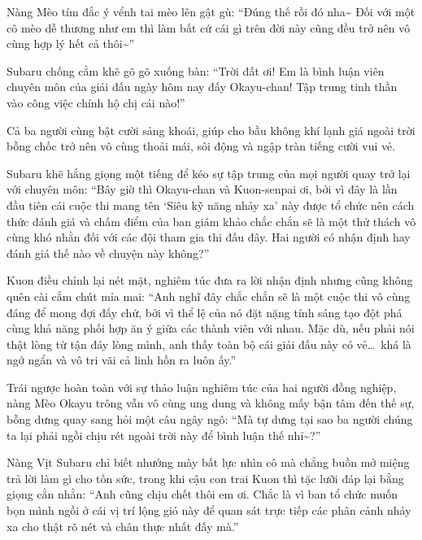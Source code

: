\documentclass[../main.tex]{subfiles}
\begin{document}
Nàng Mèo tím đắc ý vểnh tai mèo lên gật gù: ``Đúng thế rồi đó nha\~{} Đối với một cô mèo dễ thương như em thì làm bất cứ cái gì trên đời này cũng đều trở nên vô cùng hợp lý hết cả thôi\~{}''

Subaru chống cằm khẽ gõ gõ xuống bàn: ``Trời đất ơi! Em là bình luận viên chuyên môn của giải đấu ngày hôm nay đấy Okayu-chan! Tập trung tinh thần vào công việc chính hộ chị cái nào!''

Cả ba người cùng bật cười sảng khoái, giúp cho bầu không khí lạnh giá ngoài trời bỗng chốc trở nên vô cùng thoải mái, sôi động và ngập tràn tiếng cười vui vẻ.

Subaru khẽ hắng giọng một tiếng để kéo sự tập trung của mọi người quay trở lại với chuyên môn: ``Bây giờ thì Okayu-chan và Kuon-senpai ơi, bởi vì đây là lần đầu tiên cái cuộc thi mang tên `Siêu kỹ năng nhảy xa' này được tổ chức nên cách thức đánh giá và chấm điểm của ban giám khảo chắc chắn sẽ là một thử thách vô cùng khó nhằn đối với các đội tham gia thi đấu đây. Hai người có nhận định hay đánh giá thế nào về chuyện này không?''

Kuon điều chỉnh lại nét mặt, nghiêm túc đưa ra lời nhận định nhưng cũng không quên cài cắm chút mỉa mai: ``Anh nghĩ đây chắc chắn sẽ là một cuộc thi vô cùng đáng để mong đợi đấy chứ, bởi vì thể lệ của nó đặt nặng tính sáng tạo đột phá cùng khả năng phối hợp ăn ý giữa các thành viên với nhau. Mặc dù, nếu phải nói thật lòng từ tận đáy lòng mình, anh thấy toàn bộ cái giải đấu này có vẻ\dots\ khá là ngớ ngẩn và vô tri vãi cả linh hồn ra luôn ấy.''

Trái ngược hoàn toàn với sự thảo luận nghiêm túc của hai người đồng nghiệp, nàng Mèo Okayu trông vẫn vô cùng ung dung và không mấy bận tâm đến thế sự, bỗng dưng quay sang hỏi một câu ngây ngô: ``Mà tự dưng tại sao ba người chúng ta lại phải ngồi chịu rét ngoài trời này để bình luận thế nhỉ\~{}?''

Nàng Vịt Subaru chỉ biết nhướng mày bất lực nhìn cô mà chẳng buồn mở miệng trả lời làm gì cho tốn sức, trong khi cậu con trai Kuon thì tặc lưỡi đáp lại bằng giọng cằn nhằn: ``Anh cũng chịu chết thôi em ơi. Chắc là vì ban tổ chức muốn bọn mình ngồi ở cái vị trí lộng gió này để quan sát trực tiếp các phân cảnh nhảy xa cho thật rõ nét và chân thực nhất đấy mà.''

\subsubsection*{\label{ep-003.I}}
\end{document}
